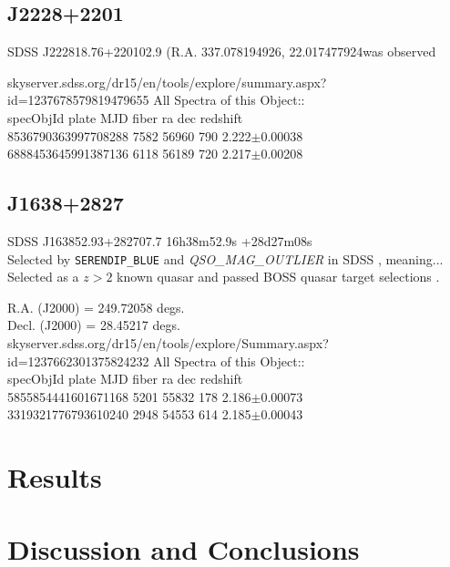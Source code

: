 \documentclass[a4paper,fleqn,usenatbib]{mnras}
\begin{document}
\subsection{J2228+2201}
SDSS J222818.76+220102.9 (R.A. 337.078194926, 22.017477924was observed 

skyserver.sdss.org/dr15/en/tools/explore/summary.aspx?id=1237678579819479655
All Spectra of this Object:: \\
specObjId	plate	MJD	fiber	ra	dec	redshift \\
8536790363997708288	7582	56960	790	2.222$\pm$0.00038\\
6888453645991387136	6118	56189	720	2.217$\pm$0.00208\\



\subsection{J1638+2827}
SDSS J163852.93+282707.7       16h38m52.9s +28d27m08s  \\
Selected by {\tt SERENDIP\_BLUE} and {\it QSO\_MAG\_OUTLIER} in SDSS \citep{Richards2002}, meaning...
Selected as a $z>2$ known quasar and passed BOSS quasar target selections \citep{Ross2012}. 


R.A. (J2000) = 249.72058 degs. \\
Decl. (J2000) = 28.45217 degs. \\
skyserver.sdss.org/dr15/en/tools/explore/Summary.aspx?id=1237662301375824232
All Spectra of this Object:: \\
specObjId	plate	MJD	fiber	ra	dec	redshift \\
5855854441601671168	5201	55832	178	2.186$\pm$0.00073\\
3319321776793610240	2948	54553	614	2.185$\pm$0.00043\\



\section{Results}

\section{Discussion and Conclusions}





\bsp	%
\label{lastpage}
\end{document}
